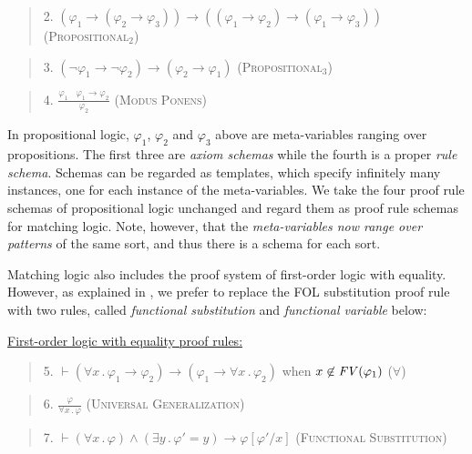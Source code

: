 \documentclass[UTF8,11pt]{article}
\theoremstyle{plain}
\theoremstyle{definition}
\theoremstyle{remark}
\newcommand{\ra}{\rightarrow}
\newcommand{\FV}{{\it FV}}
\begin{document}
\begin{quote}
2. $(\varphi_1 \ra (\varphi_2 \ra \varphi_3)) \ra ((\varphi_1 \ra \varphi_2) \ra (\varphi_1 \ra \varphi_3))$
\hfill \textsc{(Propositional$_2$)}
\end{quote}

\begin{quote}
3. $(\neg \varphi_1 \ra \neg\varphi_2) \ra (\varphi_2 \ra \varphi_1)$
\hfill \textsc{(Propositional$_3$)}
\end{quote}

\begin{quote}
4. $\displaystyle\frac{\varphi_1 \ \ \ \ \varphi_1 \ra \varphi_2}{\varphi_2}$
\hfill \textsc{(Modus Ponens)}
\end{quote}

In propositional logic, $\varphi_1$, $\varphi_2$ and $\varphi_3$ above are
meta-variables ranging over propositions.
The first three are \emph{axiom schemas} while the fourth is a proper
\emph{rule schema}.
Schemas can be regarded as templates, which specify infinitely many instances,
one for each instance of the meta-variables.
We take the four proof rule schemas of propositional logic unchanged and
regard them as proof rule schemas for matching logic.
Note, however, that the \emph{meta-variables now range over patterns} of
the same sort, and thus there is a schema for each sort.

Matching logic also includes the proof system of first-order logic with
equality.
However, as explained in \cite{rosu-2017-lmcs}, we prefer to replace the
FOL substitution proof rule with two rules, called
\emph{functional substitution}
and \emph{functional variable} below:

\vspace*{2ex}

\noindent
\underline{First-order logic with equality proof rules:}

\begin{quote}
5. $\vdash (\forall x\,.\,\varphi_1\ra\varphi_2) \ra (\varphi_1 \ra \forall x\,.\,\varphi_2)$
when $x\not\in\FV(\varphi_1)$
\hfill \textsc{($\forall$)}
\end{quote}

\begin{quote}
6. $\displaystyle\frac{\varphi}{\forall x\,.\,\varphi}$
\hfill \textsc{(Universal Generalization)}
\end{quote}

\begin{quote}
7. $\vdash (\forall x\,.\,\varphi) \wedge
  (\exists y\,.\,\varphi'=y) \ra \varphi[\varphi'/x]$
\hfill \textsc{(Functional Substitution)}
\end{quote}
\end{document}
